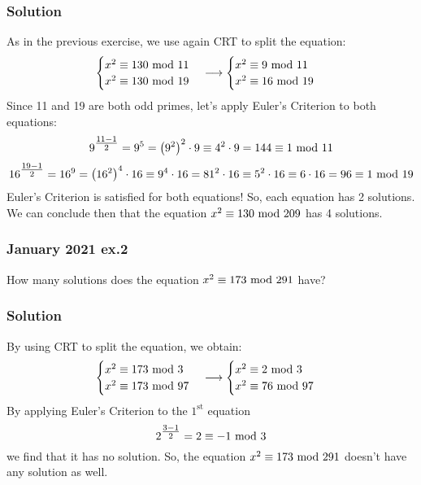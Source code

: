 \subsubsection*{Solution}
As in the previous exercise, we use again CRT to split the equation:
\begin{equation*}
    \begin{cases}
        x^2\equiv130\text{ mod }11\\
        x^2\equiv130\text{ mod }19
    \end{cases}\longrightarrow
    \begin{cases}
        x^2\equiv9\text{ mod }11\\
        x^2\equiv16\text{ mod }19
    \end{cases}
\end{equation*}
Since 11 and 19 are both odd primes, let's apply Euler's Criterion to both equations:
$$9^{\tfrac{11-1}{2}}=9^5=\left(9^2\right)^2\cdot9\equiv4^2\cdot9=144\equiv1\text{ mod }11$$
$$16^{\tfrac{19-1}{2}}=16^9=\left(16^2\right)^4\cdot16\equiv9^4\cdot16=81^2\cdot16\equiv5^2\cdot16\equiv6\cdot16=96\equiv1\text{ mod }19$$
Euler's Criterion is satisfied for both equations! So, each equation has 2 solutions. We can conclude then that the equation $x^2\equiv130\text{ mod }209$ has 4 solutions.

\subsubsection{January 2021 ex.2}
How many solutions does the equation $x^2\equiv173\text{ mod }291$ have?
\subsubsection*{Solution}
By using CRT to split the equation, we obtain:
\begin{equation*}
    \begin{cases}
        x^2\equiv173\text{ mod }3\\
        x^2\equiv173\text{ mod }97
    \end{cases}\longrightarrow
    \begin{cases}
        x^2\equiv2\text{ mod }3\\
        x^2\equiv76\text{ mod }97
    \end{cases}
\end{equation*}
By applying Euler's Criterion to the $1^{\text{st}}$ equation
$$2^{\tfrac{3-1}{2}}=2\equiv-1\text{ mod }3$$
we find that it has no solution. So, the equation $x^2\equiv173\text{ mod }291$ doesn't have any solution as well.

